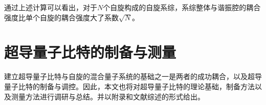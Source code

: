             
           通过上述计算可以看出，对于$N$个自旋构成的自旋系综，系综整体与谐振腔的耦合强度比单个自旋的耦合强度大了系数$\sqrt N$。
            




        \section{超导量子比特的制备与测量} %
        \label{sec:fabrication_characterization}
            
            建立超导量子比特与自旋的混合量子系统的基础之一是两者的成功耦合，以及超导量子比特的制备与调控。因此，本文也将对超导量子比特的理论基础\cite{schuster2007circuit,koch2007charge}，制备方法\cite{krantz2010investigation,kelly2015fault}以及测量方法\cite{weber2016quantum}进行调研与总结。并以附录和文献综述的形式给出。


